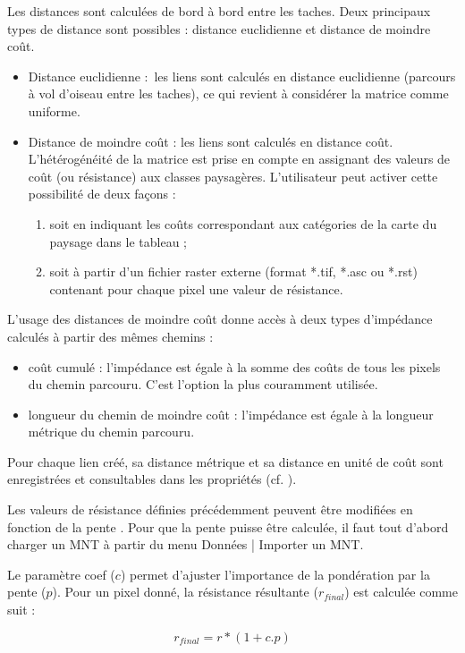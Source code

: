 \documentclass{article}
\begin{document}
Les distances sont calculées de bord à bord entre les taches. Deux principaux types de distance sont possibles : distance euclidienne et distance de moindre coût.
\begin{itemize}
	\item Distance euclidienne :~les liens sont calculés en distance euclidienne (parcours à vol d’oiseau entre les taches), ce qui revient à considérer la matrice comme uniforme.
	\item Distance de moindre coût : les liens sont calculés en distance coût. L’hétérogénéité de la matrice est prise en compte en assignant des valeurs de coût (ou résistance) aux classes paysagères. L’utilisateur peut activer cette possibilité de deux façons :
	\begin{enumerate}
		\item soit en indiquant les coûts correspondant aux catégories de la carte du paysage dans le tableau ;
		\item soit à partir d’un fichier raster externe (format *.tif, *.asc ou *.rst) contenant pour chaque pixel une valeur de résistance.
	\end{enumerate}
\end{itemize}

L’usage des distances de moindre coût donne accès à deux types d’impédance calculés à partir des mêmes chemins :
\begin{itemize}
	\item coût cumulé : l’impédance est égale à la somme des coûts de tous les pixels du chemin parcouru. C'est l'option la plus couramment utilisée.
	\item longueur du chemin de moindre coût : l’impédance est égale à la longueur métrique du chemin parcouru.
\end{itemize}

Pour chaque lien créé, sa distance métrique et sa distance en unité de coût sont enregistrées et consultables dans les propriétés (cf. ).

Les valeurs de résistance définies précédemment peuvent être modifiées en fonction de la pente \cite{2015_monkey}. Pour que la pente puisse être calculée, il faut tout d'abord charger un MNT à partir du menu Données | Importer un MNT. 

Le paramètre coef ($c$) permet d'ajuster l'importance de la pondération par la pente ($p$). Pour un pixel donné, la résistance résultante ($r_{final}$) est calculée comme suit :

$$r_{final} = r * (1 + c.p)$$
\end{document}
